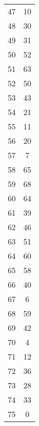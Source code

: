 \begin{table}
\begin{tabular}{c c }
47 & 10 \\
48 & 30 \\
49 & 31 \\
50 & 52 \\
51 & 63 \\
52 & 50 \\
53 & 43 \\
54 & 21 \\
55 & 11 \\
56 & 20 \\
57 & 7 \\
58 & 65 \\
59 & 68 \\
60 & 64 \\
61 & 39 \\
62 & 46 \\
63 & 51 \\
64 & 60 \\
65 & 58 \\
66 & 40 \\
67 & 6 \\
68 & 59 \\
69 & 42 \\
70 & 4 \\
71 & 12 \\
72 & 36 \\
73 & 28 \\
74 & 33 \\
75 & 0 \\
\hline
\end{tabular}
\end{table}